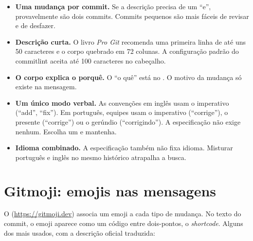 \begin{itemize}
  \item \textbf{Uma mudança por commit.} Se a descrição precisa de um \enquote{e}, provavelmente são dois commits. Commits pequenos são mais fáceis de revisar e de desfazer.
  \item \textbf{Descrição curta.} O livro \emph{Pro Git} recomenda uma primeira linha de até uns 50 caracteres e o corpo quebrado em 72 colunas. A configuração padrão do commitlint aceita até 100 caracteres no cabeçalho.
  \item \textbf{O corpo explica o porquê.} O \enquote{o quê} está no . O motivo da mudança só existe na mensagem.
  \item \textbf{Um único modo verbal.} As convenções em inglês usam o imperativo (\enquote{add}, \enquote{fix}). Em português, equipes usam o imperativo (\enquote{corrige}), o presente (\enquote{corrige}) ou o gerúndio (\enquote{corrigindo}). A especificação não exige nenhum. Escolha um e mantenha.
  \item \textbf{Idioma combinado.} A especificação também não fixa idioma. Misturar português e inglês no mesmo histórico atrapalha a busca.
\end{itemize}

\section{Gitmoji: emojis nas mensagens}

O  (\url{https://gitmoji.dev}) associa um emoji a cada tipo de mudança. No texto do commit, o emoji aparece como um código entre dois-pontos, o \emph{shortcode}. Alguns dos mais usados, com a descrição oficial traduzida:

